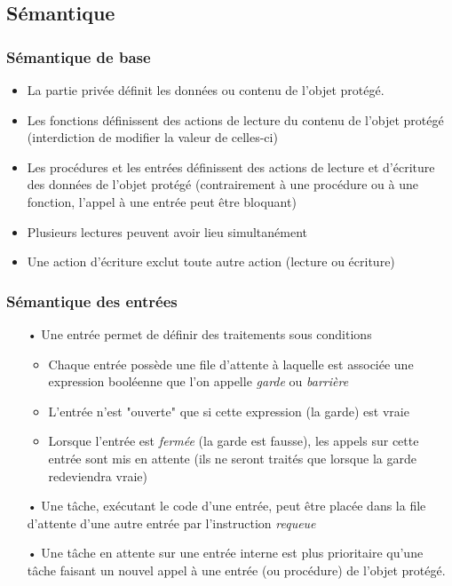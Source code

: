 \documentclass[11pt,a4paper]{article}
\begin{document}
\subsection{Sémantique}
\subsubsection{Sémantique de base}
\begin{itemize}
\item La partie privée définit les données ou contenu de l'objet protégé.
\item Les fonctions définissent des actions de lecture du contenu de l'objet protégé (interdiction de modifier la valeur de celles-ci)
\item Les procédures et les entrées définissent des actions de lecture et d'écriture des données de l'objet protégé (contrairement à une procédure ou à une fonction, l'appel à une entrée peut être bloquant)
\item Plusieurs lectures peuvent avoir lieu simultanément
\item Une action d'écriture exclut toute autre action (lecture ou écriture)
\end{itemize}
\subsubsection{Sémantique des entrées}
\begin{itemize}
\item[•]Une entrée permet de définir des traitements sous conditions
\begin{itemize}
\item Chaque entrée possède une file d'attente à laquelle est associée une expression booléenne que l'on appelle \textit{garde} ou \textit{barrière}
\item L'entrée n'est "ouverte" que si cette expression (la garde) est vraie
\item Lorsque l'entrée est \textit{fermée} (la garde est fausse), les appels sur cette entrée sont mis en attente (ils ne seront traités que lorsque la garde redeviendra vraie)
\end{itemize}
\item[•]Une tâche, exécutant le code d'une entrée, peut être placée dans la file d'attente d'une autre entrée par l'instruction \textit{requeue}
\item[•]Une tâche en attente sur une entrée interne est plus prioritaire qu'une tâche faisant un nouvel appel à une entrée (ou procédure) de l'objet protégé.
\end{itemize}
\end{document}
